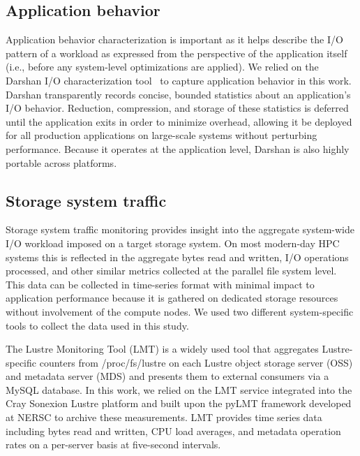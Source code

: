 \subsection{Application behavior} \label{sec:methods/darshan}

Application behavior characterization is important as it helps describe the I/O pattern of a workload as expressed from the perspective of the application itself (i.e., before any system-level optimizations are applied).
We relied on the Darshan I/O characterization tool~\cite{carns200924}
to capture application behavior in this work.  Darshan transparently records concise, bounded statistics about an application's I/O behavior.
Reduction, compression, and storage of these statistics is deferred until the
application exits in order to minimize overhead, allowing it be deployed for
all production applications on large-scale systems without perturbing
performance.  Because it operates at the application level, Darshan is also
highly portable across platforms.

\subsection{Storage system traffic} \label{sec:methods/storagesystraffic}

Storage system traffic monitoring provides insight into the aggregate system-wide I/O workload imposed on a target storage system.
On most modern-day HPC systems this is reflected in the aggregate bytes read
and written, I/O operations processed, and other similar metrics collected at
the parallel file system level.  This data can be collected in time-series format
with minimal impact to application performance because it is gathered on
dedicated storage resources without involvement of the compute nodes.
We used two different system-specific tools to collect the data used in this study.

\label{sec:methods/lmt}
The Lustre Monitoring Tool (LMT) is a widely used tool that aggregates Lustre-specific counters from /proc/fs/lustre on each Lustre object storage server (OSS) and metadata server (MDS) and presents them to external consumers via a MySQL database.
In this work, we relied on the LMT service integrated into the Cray Sonexion Lustre platform \cite{Keopp2014} and built upon the pyLMT framework developed at NERSC \cite{Uselton2009} to archive these measurements.
LMT provides time series data including bytes read and written, CPU load averages, and metadata operation rates on a per-server basis at five-second intervals.

